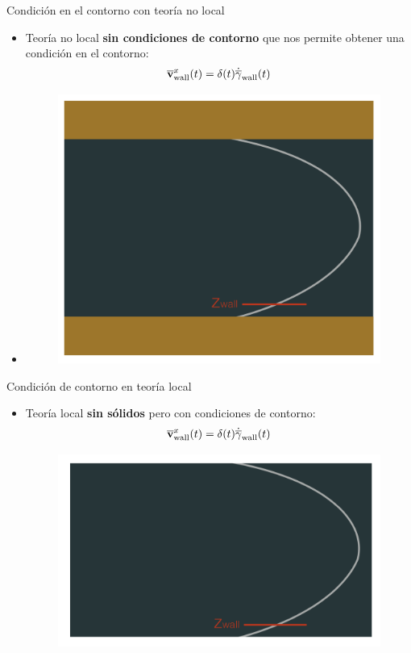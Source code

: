 \documentclass{beamer}
\begin{document}
\begin{frame}{Condición en el contorno con teoría no local}
  \begin{itemize}
    \item[] \alert{Teoría no local} \textbf{sin condiciones de contorno} que nos permite obtener una condición en el contorno:  
      \begin{align}
      \overline{\bf v}^x_{\rm wall}(t) = \delta(t)\dot{\overline{\gamma}}_{\rm wall}(t)
        \nonumber
      \end{align}
\item[]
  \begin{figure}
    \includegraphics[width=0.55\linewidth]{condicion_contorno}
  \end{figure}
  \end{itemize}
\end{frame}

  \begin{frame}{Condición de contorno en teoría local}
    \begin{itemize}
      \item[] \alert{Teoría local} \textbf{sin sólidos} pero con condiciones de contorno:
        \begin{align}
      \overline{\bf v}^x_{\rm wall}(t) = \delta(t)\dot{\overline{\gamma}}_{\rm wall}(t)
        \nonumber
        \end{align}
  \begin{figure}
    \includegraphics[width=0.55\linewidth]{condicion_contorno_local}
  \end{figure}
\end{itemize}
\end{frame}
\end{document}
